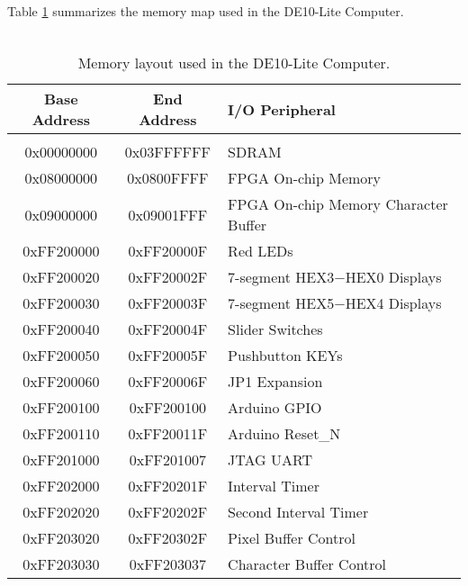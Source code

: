 \noindent
Table \ref{tab:memorylayout} summarizes the memory map used in the DE10-Lite Computer.
~\\
~\\

\begin{table}[h]
    \begin{center}
    \begin{tabular}{c|c|l}
            \textbf{Base Address}
            & \textbf{End Address}
            & \textbf{I/O Peripheral}
				\\\hline\vspace{-3mm}\\
            0x00000000
            & 0x03FFFFFF
            & SDRAM
        \\
            0x08000000
            & 0x0800FFFF
            & FPGA On-chip Memory
        \\
            0x09000000
            & 0x09001FFF
            & FPGA On-chip Memory Character Buffer
        \\
            0xFF200000
            & 0xFF20000F
            & Red LEDs
        \\
            0xFF200020
            & 0xFF20002F
            & 7-segment HEX3$-$HEX0 Displays
        \\
            0xFF200030
            & 0xFF20003F
            & 7-segment HEX5$-$HEX4 Displays
        \\
            0xFF200040
            & 0xFF20004F
            & Slider Switches
        \\
            0xFF200050
            & 0xFF20005F
            & Pushbutton KEYs
        \\
            0xFF200060
            & 0xFF20006F
            & JP1 Expansion
        \\
        	0xFF200100
        	& 0xFF200100
        	& Arduino GPIO
        \\
        	0xFF200110
        	& 0xFF20011F
        	& Arduino Reset\_N
        \\
            0xFF201000
            & 0xFF201007
            & JTAG UART
        \\
            0xFF202000
            & 0xFF20201F
            & Interval Timer
        \\  
            0xFF202020
            & 0xFF20202F
            & Second Interval Timer
        \\
            0xFF203020
            & 0xFF20302F
            & Pixel Buffer Control
        \\
            0xFF203030
            & 0xFF203037
            & Character Buffer Control
        \\
    \end{tabular}
    \caption{Memory layout used in the DE10-Lite Computer.}
    \label{tab:memorylayout}
    \end{center}
\end{table}

